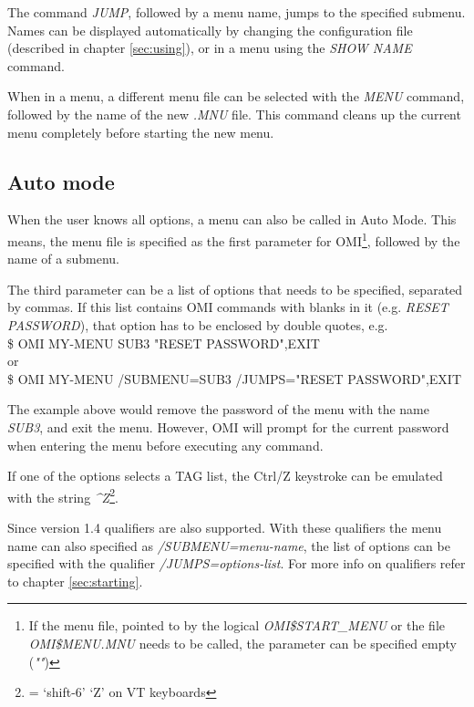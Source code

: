 \documentclass[a4paper]{book}
\newcommand{\vs}{\vspace{3mm}}
\renewcommand{\indent}{\hspace*{5mm}}
\begin{document}
\vs

The command \textsl{JUMP}, followed by a menu name, jumps to 
the specified submenu. Names can be displayed automatically by changing the 
configuration file (described in chapter \ref{sec:using}), or in a menu using the \textsl{SHOW 
NAME} command.

\vs

When in a menu, a different menu file can be selected with the \textsl{MENU} command, 
followed by the name of the new \textsl{.MNU} file. This command cleans up the 
current menu completely before starting the new menu.

\subsection{Auto mode}
\label{subsubsec:mylabel10}

When the user knows all options, a menu can also be called in Auto Mode. 
This means, the menu file is specified as the first parameter for 
OMI\footnote{ If the menu file, pointed to by the logical 
\textsl{OMI{\$}START{\_}MENU} or the file \textsl{OMI{\$}MENU.MNU} needs to be called,
the parameter can be specified empty (\textsl{""})}, followed by the name of a submenu.

\vs

The third parameter can be a list of options that needs to be specified, 
separated by commas. If this list contains OMI commands with blanks in it 
(e.g. \textsl{RESET PASSWORD}), that option has to be enclosed by double quotes, e.g. \\
\indent\textsf{{\$} OMI MY-MENU SUB3 "RESET PASSWORD",EXIT} \\
or \\
\indent\textsf{{\$} OMI MY-MENU /SUBMENU=SUB3 /JUMPS="RESET PASSWORD",EXIT}

The example above would remove the password of the menu with the name \textsl{SUB3}, 
and exit the menu. However, OMI will prompt for the current password when 
entering the menu before executing any command.

\vs

If one of the options selects a TAG list, the Ctrl/Z{} keystroke can be 
emulated with the string \textsl{\^{}Z}\footnote{ = `shift-6' `Z' on VT keyboards}.

\vs

Since version 1.4 qualifiers are also supported. With these qualifiers the 
menu name can also specified as \textsl{/SUBMENU=menu-name}, the list of 
options can be specified with the qualifier \textsl{/JUMPS=options-list}. 
For more info on qualifiers refer to chapter \ref{sec:starting}.
\end{document}
